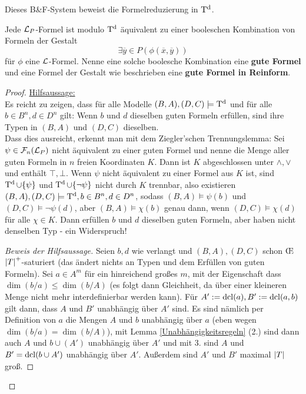 Dieses B\&F-System beweist die Formelreduzierung in $\operatorname{T^d}$.
\begin{theorem}
	Jede $\mathcal{L}_P$-Formel ist modulo $\operatorname{T^d}$ äquivalent zu einer booleschen Kombination von Formeln der Gestalt
	$$\exists\overline{y}\in P(\phi(\overline{x},\overline{y}))$$
	für $\phi$ eine $\mathcal{L}$-Formel. Nenne eine solche boolesche Kombination eine \textbf{gute Formel} und eine Formel der Gestalt wie beschrieben eine \textbf{gute Formel in Reinform}.
\end{theorem}
\begin{proof}
	\underline{Hilfsaussage:}\\
	Es reicht zu zeigen, dass für alle Modelle $(B,A),(D,C)\models\operatorname{T^d}$ und für alle $b\in B^n,d\in D^n$ gilt: Wenn $b$ und $d$ dieselben guten Formeln erfüllen, sind ihre Typen in $(B,A)$ und $(D,C)$ dieselben.\\
	Dass dies ausreicht, erkennt man mit dem Ziegler'schen Trennungslemma: Sei $\psi\in\mathcal{F}_n(\mathcal{L}_P)$ nicht äquivalent zu einer guten Formel und nenne die Menge aller guten Formeln in $n$ freien Koordinaten $K$. Dann ist $K$ abgeschlossen unter $\land,\lor$ und enthält $\top,\bot$. Wenn $\psi$ nicht äquivalent zu einer Formel aus $K$ ist, sind $\operatorname{T^d}\cup\{\psi\}$ und $\operatorname{T^d}\cup\{\neg\psi\}$ nicht durch $K$ trennbar, also existieren $(B,A),(D,C)\models\operatorname{T^d},b\in B^n,d\in D^n$, sodass $(B,A)\models\psi(b)$ und $(D,C)\models\neg\psi(d)$, aber $(B,A)\models\chi(b)$ genau dann, wenn $(D,C)\models\chi(d)$ für alle $\chi\in K$. Dann erfüllen $b$ und $d$ dieselben guten Formeln, aber haben nicht denselben Typ - ein Widerspruch!\\
	\begin{proof}[Beweis der Hilfsaussage]
		Seien $b,d$ wie verlangt und $(B,A),(D,C)$ schon \OE\linebreak ${\left| T \right|}^+$-saturiert (das ändert nichts an Typen und dem Erfüllen von guten Formeln). Sei $a\in A^m$ für ein hinreichend großes $m$, mit der Eigenschaft dass $\dim(b/a)\leq\dim(b/A)$ (es folgt dann Gleichheit, da über einer kleineren Menge nicht mehr interdefinierbar werden kann). Für $A':=\operatorname{dcl}(a),B':=\operatorname{dcl}(a,b)$ gilt dann, dass $A$ und $B'$ unabhängig über $A'$ sind. Es sind nämlich per Definition von $a$ die Mengen $A$ und $b$ unabhängig über $a$ (eben wegen $\dim(b/a)=\dim(b/A)$), mit Lemma \ref{Unabhängigkeitsregeln} (2.) sind dann auch $A$ und $b\cup(A')$ unabhängig über $A'$ und mit 3. sind $A$ und $B'=\operatorname{dcl}(b\cup A')$ unabhängig über $A'$. Außerdem sind $A'$ und $B'$ maximal ${\left| T \right|}$ groß.\newpage

\end{proof}
\end{proof}
